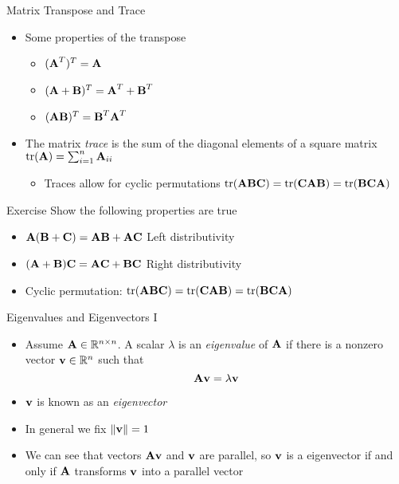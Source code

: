 \documentclass{beamer}
\begin{document}
\begin{frame}{Matrix Transpose and Trace} 
 \begin{itemize} 
  \item Some properties of the transpose  
  \begin{itemize}
  \item $(\textbf{A}^T)^T = \textbf{A}$ 
  \item $(\textbf{A} + \textbf{B})^T = \textbf{A}^T + \textbf{B}^T$ 
  \item $(\textbf{A}\textbf{B})^T = \textbf{B}^T\textbf{A}^T$  
  \end{itemize} 
 \item The matrix \emph{trace} is the sum of the diagonal elements of a square matrix $\mbox{tr}(\textbf{A}) = \sum_{i=1}^n \textbf{A}_{ii}$ 
 \begin{itemize} 
 \item Traces allow for cyclic permutations $\mbox{tr}(\textbf{A}\textbf{B}\textbf{C}) = \mbox{tr}(\textbf{C}\textbf{A}\textbf{B}) = \mbox{tr}(\textbf{B}\textbf{C}\textbf{A})$ 
 \end{itemize}
 \end{itemize}
\end{frame}

\begin{frame}{Exercise} 
Show the following properties are true
\begin{itemize}
 \item $\textbf{A}(\textbf{B} + \textbf{C}) = \textbf{A}\textbf{B} + \textbf{A}\textbf{C}$ Left distributivity 
 \item $(\textbf{A} +\textbf{B}) \textbf{C} = \textbf{A}\textbf{C} +\textbf{B}\textbf{C}$ Right distributivity 
 \item Cyclic permutation: $\mbox{tr}(\textbf{A}\textbf{B}\textbf{C}) = \mbox{tr}(\textbf{C}\textbf{A}\textbf{B}) = \mbox{tr}(\textbf{B}\textbf{C}\textbf{A})$ 
\end{itemize}
\end{frame}

\begin{frame}{Eigenvalues and Eigenvectors I}  
\begin{itemize} 
 \item Assume $\textbf{A} \in \mathbb{R}^{n \times n}$. A scalar $\lambda$ is an \emph{eigenvalue} of $\textbf{A}$ if there is a nonzero vector $\textbf{v} \in \mathbb{R}^n$  such that 
\begin{displaymath}
 \textbf{A}\textbf{v} = \lambda\textbf{v}
\end{displaymath}
\item $\textbf{v}$ is known as an \emph{eigenvector}
 \item In general we fix $\|\textbf{v}\| = 1$ 
 \item We can see that vectors $\textbf{A}\textbf{v}$ and $\textbf{v}$ are parallel, so $\textbf{v}$ is a eigenvector if and only if $\textbf{A}$ transforms $\textbf{v}$ into a parallel vector  
\end{itemize}
\end{frame}
\end{document}
